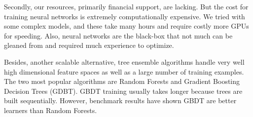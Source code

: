 Secondly, our resources, primarily financial support, are lacking. But the cost for training neural networks is extremely computationally expensive. We tried with some complex models, and these take many hours and require costly more GPUs for speeding. Also, neural networks are the black-box that not much can be gleaned from and required much experience to optimize.

Besides, another scalable alternative, tree ensemble algorithms handle very well high dimensional feature spaces as well as a large number of training examples. The two most popular algorithms are Random Forests and Gradient Boosting Decision Trees (GDBT). GBDT training usually takes longer because trees are built sequentially. However, benchmark results have shown GBDT are better learners than Random Forests.
